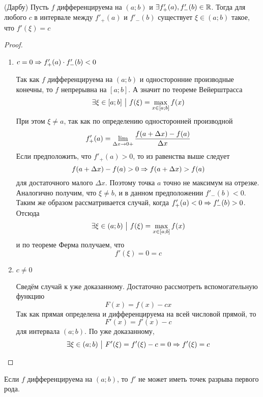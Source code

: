 \begin{theorem} (Дарбу)
	Пусть $f$ дифференцируема на $(a; b)$ и $\exists f'_+(a), f'_-(b) \in \mathbb{R}$. Тогда для любого $c$ в интервале между $f'_+(a)$ и $f'_-(b)$ существует $\xi \in (a; b)$ такое, что $f'(\xi) = c$
\end{theorem}

\begin{proof}~
	\begin{enumerate}
		\item $c = 0 \Rightarrow f'_+(a) \cdot f'_-(b) < 0$
		
		Так как $f$ дифференцируема на $(a; b)$ и односторонние производные конечны, то $f$ непрерывна на $[a; b]$. А значит по теореме Вейерштрасса
		\[
			\exists \xi \in [a; b] \ \big|\  f(\xi) = \max\limits_{x \in [a; b]} f(x)
		\]
		При этом $\xi \neq a$, так как по определению односторонней производной
		\[
			f'_+(a) = \lim\limits_{\Delta x \to 0+} \frac{f(a + \Delta x) - f(a)}{\Delta x}
		\]
		Если предположить, что $f'_+(a) > 0$, то из равенства выше следует
		\[
			f(a + \Delta x) - f(a) > 0 \Rightarrow f(a + \Delta x) > f(a)
		\]
		для достаточного малого $\Delta x$. Поэтому точка $a$ точно не максимум на отрезке. Аналогично получим, что $\xi \neq b$, и в данном предположении $f'_-(b) < 0$. Таким же образом рассматривается случай, когда $f'_+(a) < 0 \Rightarrow f'_-(b) > 0$. Отсюда
		\[
			\exists \xi \in (a; b) \ \big|\  f(\xi) = \max\limits_{x \in [a; b]} f(x)
		\]
		и по теореме Ферма получаем, что
		\[
			f'(\xi) = 0 = c
		\]
		
		\item $c \neq 0$
		
		Сведём случай к уже доказанному. Достаточно рассмотреть вспомогательную функцию
		\[
			F(x) = f(x) - cx
		\]
		Так как прямая определена и дифференцируема на всей числовой прямой, то
		\[
			F'(x) = f'(x) - c
		\]
		для интервала $(a; b)$. По уже доказанному, 
		\[
			\exists \xi \in (a; b) \ \big|\  F'(\xi) = f'(\xi) - c = 0 \Rightarrow f'(\xi) = c
		\]
	\end{enumerate}
\end{proof}

\begin{corollary}
	Если $f$ дифференцируема на $(a; b)$, то $f'$ не может иметь точек разрыва первого рода.
\end{corollary}

